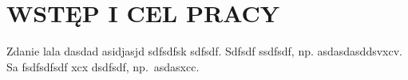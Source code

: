 \chapter{WSTĘP I CEL PRACY}
\label{chpt:wstęp-i-cel-pracy}

Zdanie lala dasdad asidjasjd sdfsdfsk sdfsdf. Sdfsdf ssdfsdf, np. asdasdasddsvxcv. Sa fsdfsdfsdf xcx dsdfsdf, np.\ asdasxcc.